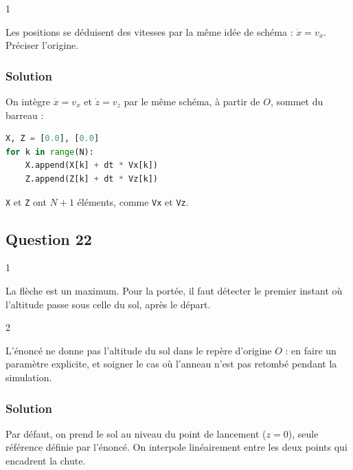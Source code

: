 \documentclass[11pt,a4paper]{article}
\begin{document}
\begin{indication}{1}

Les positions se déduisent des vitesses par la même idée de schéma : \(\dot x=v_x\). Préciser l'origine.

\end{indication}

\hypertarget{solution-20}{%
\subsubsection{Solution}\label{solution-20}}

On intègre \(\dot x=v_x\) et \(\dot z=v_z\) par le même schéma, à partir de \(O\), sommet du barreau :

\begin{lstlisting}[language=Python]
X, Z = [0.0], [0.0]
for k in range(N):
    X.append(X[k] + dt * Vx[k])
    Z.append(Z[k] + dt * Vz[k])
\end{lstlisting}

\texttt{X} et \texttt{Z} ont \(N+1\) éléments, comme \texttt{Vx} et \texttt{Vz}.

\hypertarget{question-22}{%
\subsection{Question 22}\label{question-22}}

\begin{indication}{1}

La flèche est un maximum. Pour la portée, il faut détecter le premier instant où l'altitude passe sous celle du sol, après le départ.

\end{indication}

\begin{indication}{2}

L'énoncé ne donne pas l'altitude du sol dans le repère d'origine \(O\) : en faire un paramètre explicite, et soigner le cas où l'anneau n'est pas retombé pendant la simulation.

\end{indication}

\hypertarget{solution-21}{%
\subsubsection{Solution}\label{solution-21}}

Par défaut, on prend le sol au niveau du point de lancement (\(z=0\)), seule référence définie par l'énoncé. On interpole linéairement entre les deux points qui encadrent la chute.
\end{document}
